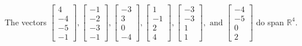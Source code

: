 \begin{exercise}
\begin{exerciseStatement}
  \end{exerciseStatement}
  \begin{exerciseAnswer}
   The vectors \(\left[\begin{array}{r}
4 \\
-4 \\
-5 \\
-1
\end{array}\right] , \left[\begin{array}{r}
-1 \\
-2 \\
-3 \\
-1
\end{array}\right] , \left[\begin{array}{r}
-3 \\
3 \\
0 \\
-4
\end{array}\right] , \left[\begin{array}{r}
1 \\
-1 \\
2 \\
4
\end{array}\right] , \left[\begin{array}{r}
-3 \\
-3 \\
1 \\
1
\end{array}\right] , \text{ and } \left[\begin{array}{r}
-4 \\
-5 \\
0 \\
2
\end{array}\right]\) 
  	 do  
	span \(\mathbb{R}^4\).
  


  \end{exerciseAnswer}
\end{exercise}